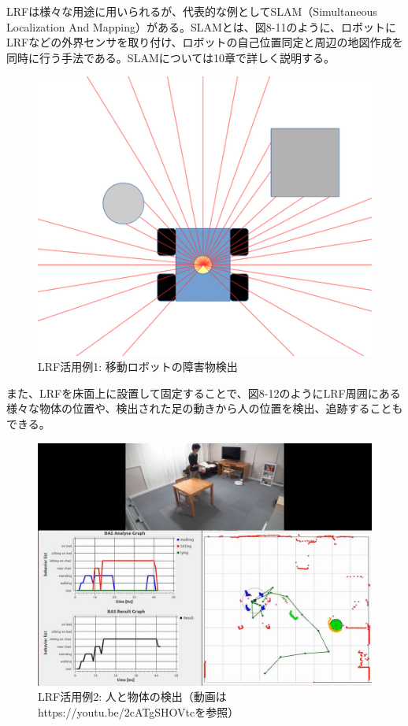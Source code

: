 LRFは様々な用途に用いられるが、代表的な例としてSLAM（Simultaneous Localization And Mapping）がある。SLAMとは、図8-11のように、ロボットにLRFなどの外界センサを取り付け、ロボットの自己位置同定と周辺の地図作成を同時に行う手法である。SLAMについては10章で詳しく説明する。

\begin{figure}[ht]
  \centering
  \includegraphics[width=\columnwidth]{pictures/chapter8/pic_08_11.png}
  \caption{LRF活用例1: 移動ロボットの障害物検出}
\end{figure}

また、LRFを床面上に設置して固定することで、図8-12のようにLRF周囲にある様々な物体の位置や、検出された足の動きから人の位置を検出、追跡することもできる。

\begin{figure}[ht]
  \centering
  \includegraphics[width=\columnwidth]{pictures/chapter8/pic_08_12.png}
  \caption{LRF活用例2: 人と物体の検出（動画はhttps://youtu.be/2cATgSHOVtcを参照）}
\end{figure}

